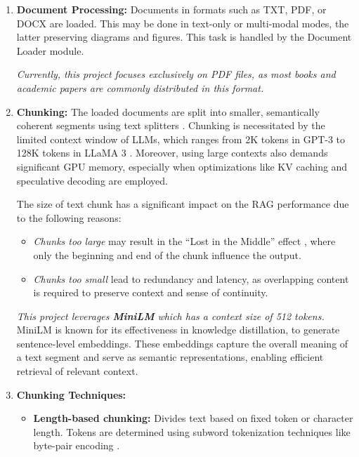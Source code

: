 \begin{enumerate}[label=\alph*.]
  \item \textbf{Document Processing:} Documents in formats such as TXT, PDF, or DOCX are loaded. This may be done in text-only or multi-modal modes, the latter preserving diagrams and figures. This task is handled by the Document Loader module.
  
  \textit{Currently, this project focuses exclusively on PDF files, as most books and academic papers are commonly distributed in this format.}

  \item \textbf{Chunking:} The loaded documents are split into smaller, semantically coherent segments using text splitters \cite{langchain2023textsplitters}. Chunking is necessitated by the limited context window of LLMs, which ranges from 2K tokens in GPT-3 to 128K tokens in LLaMA 3 \cite{touvron2024llama3}. Moreover, using large contexts also demands significant GPU memory, especially when optimizations like KV caching and speculative decoding are employed.


  The size of text chunk has a significant impact on the RAG performance due to the following reasons:
  \begin{itemize}
    \item \textit{Chunks too large} may result in the ``Lost in the Middle'' effect \cite{liu2023long}, where only the beginning and end of the chunk influence the output.
    \item \textit{Chunks too small} lead to redundancy and latency, as overlapping content is required to preserve context and sense of continuity.
  \end{itemize}
  
\textit{This project leverages \textbf{MiniLM}\cite{wang2020minilm} which has a context size of 512 tokens.} MiniLM is known for its effectiveness in knowledge distillation\cite{hinton2015distilling}, to generate sentence-level embeddings. These embeddings capture the overall meaning of a text segment and serve as semantic representations, enabling efficient retrieval of relevant context. 




  \item \textbf{Chunking Techniques:}
  \begin{itemize}
    \item \textbf{Length-based chunking:} Divides text based on fixed token or character length. Tokens are determined using subword tokenization techniques like byte-pair encoding \cite{sennrich2015neural}.
  

\end{itemize}
\end{enumerate}
